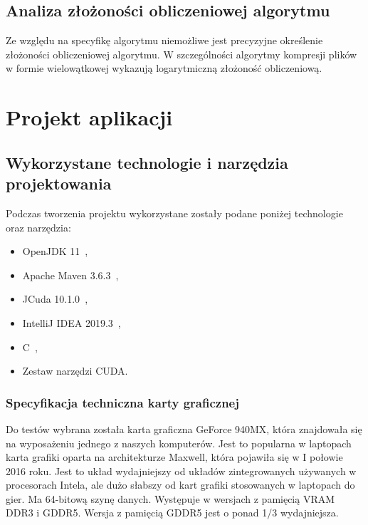 \documentclass[12pt,a4paper,titlepage]{article}
\begin{document}
\subsection{Analiza złożoności obliczeniowej algorytmu}
Ze względu na specyfikę algorytmu niemożliwe jest precyzyjne określenie złożoności obliczeniowej algorytmu. W szczególności algorytmy kompresji plików w formie wielowątkowej wykazują logarytmiczną złożoność obliczeniową. 

\newpage
\section{Projekt aplikacji}
\subsection{Wykorzystane technologie i narzędzia projektowania}
Podczas tworzenia projektu wykorzystane zostały podane poniżej technologie oraz narzędzia:
\begin{itemize}
    \item OpenJDK 11~\cite{openjdk-11},
    \item Apache Maven 3.6.3~\cite{maven},
    \item JCuda 10.1.0~\cite{jcuda},
    \item IntelliJ IDEA 2019.3~\cite{intellij-idea},
    \item C~\cite{c-standard},
    \item Zestaw narzędzi CUDA.~\cite{cuda-toolkit-documentation}
\end{itemize}

\subsubsection{Specyfikacja techniczna karty graficznej}
Do testów wybrana została karta graficzna GeForce 940MX, która znajdowała się na wyposażeniu jednego z naszych komputerów. Jest to popularna w laptopach karta grafiki oparta na architekturze Maxwell, która pojawiła się w I połowie 2016 roku. Jest to układ wydajniejszy od układów zintegrowanych używanych w procesorach Intela, ale dużo słabszy od kart grafiki stosowanych w laptopach do gier. Ma 64-bitową szynę danych. Występuje w wersjach z pamięcią VRAM DDR3 i GDDR5. Wersja z pamięcią GDDR5 jest o ponad 1/3 wydajniejsza.~\cite{gtx-940mx}
\end{document}
